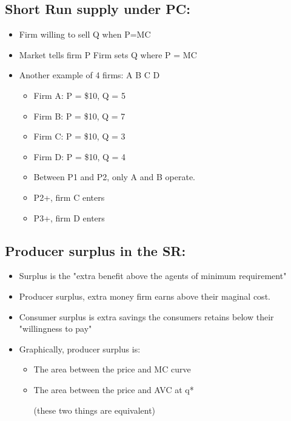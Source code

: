 \documentclass{article}
\begin{document}
\subsection{Short Run supply under PC:}
\begin{itemize}
  \item Firm willing to sell Q when P=MC
  \item Market tells firm P \Rightarrow{} Firm sets Q where P = MC
  \item Another example of 4 firms: A B C D
    \begin{itemize}
      \item Firm A: P = \$10, Q = 5
      \item Firm B: P = \$10, Q = 7
      \item Firm C: P = \$10, Q = 3
      \item Firm D: P = \$10, Q = 4
      \item Between P1 and P2, only A and B operate.
      \item P2+, firm C enters
      \item P3+, firm D enters
    \end{itemize}
\end{itemize}

\subsection{Producer surplus in the SR:}
\begin{itemize}
  \item Surplus is the "extra benefit above the agents of minimum requirement"
  \item Producer surplus, extra money firm earns above their maginal cost.
  \item Consumer surplus is extra savings the consumers retains below their "willingness to pay"
  \item Graphically, producer surplus is:
    \begin{itemize}
      \item The area between the price and MC curve
      \item The area between the price and AVC at q*

        (these two things are equivalent)
    \end{itemize}
\end{itemize}
\end{document}
